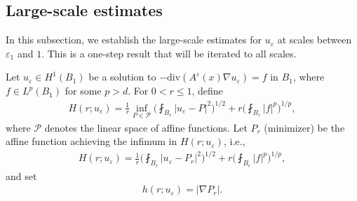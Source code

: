 \documentclass[reqno,12pt]{amsart} %
\theoremstyle{definition}
\theoremstyle{remark}
\numberwithin{equation}{section}
\newcommand{\e}{\varepsilon}
\begin{document}

\subsection{Large-scale estimates}\label{sec_large-scale_u}

In this subsection, we establish the large-scale estimates for $u_\varepsilon$ at scales 
between $\e_1$ and $1$. This is a one-step result that will be iterated to all  scales.

Let $u_\varepsilon\in H^1(B_1)$ be a solution to $-\mathrm{div}(A^\varepsilon(x)\nabla u_\varepsilon)=f$ in $B_1$, where $f\in L^p(B_1)$ for some $p>d$. For $0<r\leq 1$, define
\begin{align*}
  H(r; u_\varepsilon)=\frac{1}{r}\inf_{P\in \mathcal{P}}\bigg(\fint_{B_r}|u_\varepsilon-P|^2\bigg)^{1/2}+r\bigg(\fint_{B_r}|f|^p\bigg)^{1/p},
\end{align*}
where $\mathcal{P}$ denotes the linear space of affine functions. 
Let $P_r$ (minimizer) be the affine function achieving the infimum in $H(r; u_\varepsilon)$, i.e.,
\begin{align*}
  H(r; u_\varepsilon)=\frac{1}{r}\bigg(\fint_{B_r}|u_\varepsilon-P_r|^2\bigg)^{1/2}+r\bigg(\fint_{B_r}|f|^p\bigg)^{1/p},
\end{align*}
and set
\begin{align*}
  h(r; u_\varepsilon)=|\nabla P_r|.
\end{align*}
\end{document}
